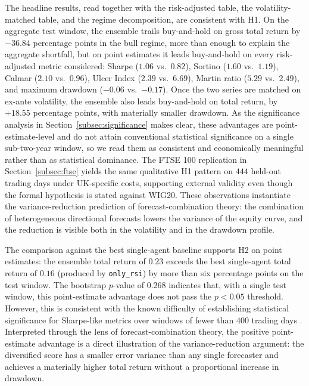 \documentclass{ieeeaccess}
\newcommand{\TRtest}{\ensuremath{0.23}}
\newcommand{\Shtest}{\ensuremath{1.06}}
\newcommand{\MDDtest}{\ensuremath{-0.06}}
\newcommand{\Calmtest}{\ensuremath{2.10}}
\newcommand{\BHsharpe}{\ensuremath{0.82}}
\newcommand{\MDDbh}{\ensuremath{-0.17}}
\newcommand{\Calmbh}{\ensuremath{0.96}}
\newcommand{\BestSingleName}{\texttt{only\_rsi}}
\newcommand{\BestSingleTR}{\ensuremath{0.16}}
\newcommand{\PvsBestSingle}{\ensuremath{0.268}}
\newcommand{\EnsSortino}{\ensuremath{1.60}}
\newcommand{\BHSortino}{\ensuremath{1.19}}
\newcommand{\EnsUlcer}{\ensuremath{2.39}}
\newcommand{\BHUlcer}{\ensuremath{6.69}}
\newcommand{\EnsMartin}{\ensuremath{5.29}}
\newcommand{\BHMartin}{\ensuremath{2.49}}
\newcommand{\VolScaledExcessPP}{\ensuremath{+18.55}}
\newcommand{\BullShortfallPP}{\ensuremath{-36.84}}
\newcommand{\FtseOOSDays}{\ensuremath{444}}
\begin{document}
The headline results, read together with the risk-adjusted table, the volatility-matched table, and the regime decomposition, are consistent with H1. On the aggregate test window, the ensemble trails buy-and-hold on gross total return by $\BullShortfallPP{}$ percentage points in the bull regime, more than enough to explain the aggregate shortfall, but on point estimates it leads buy-and-hold on every risk-adjusted metric considered: Sharpe ($\Shtest{}$ vs.\ $\BHsharpe{}$), Sortino ($\EnsSortino{}$ vs.\ $\BHSortino{}$), Calmar ($\Calmtest{}$ vs.\ $\Calmbh{}$), Ulcer Index ($\EnsUlcer{}$ vs.\ $\BHUlcer{}$), Martin ratio ($\EnsMartin{}$ vs.\ $\BHMartin{}$), and maximum drawdown ($\MDDtest{}$ vs.\ $\MDDbh{}$). Once the two series are matched on ex-ante volatility, the ensemble also leads buy-and-hold on total return, by $\VolScaledExcessPP{}$ percentage points, with materially smaller drawdown. As the significance analysis in Section~\ref{subsec:significance} makes clear, these advantages are point-estimate-level and do not attain conventional statistical significance on a single sub-two-year window, so we read them as consistent and economically meaningful rather than as statistical dominance. The FTSE 100 replication in Section~\ref{subsec:ftse} yields the same qualitative H1 pattern on \FtseOOSDays{} held-out trading days under UK-specific costs, supporting external validity even though the formal hypothesis is stated against WIG20. These observations instantiate the variance-reduction prediction of forecast-combination theory: the combination of heterogeneous directional forecasts lowers the variance of the equity curve, and the reduction is visible both in the volatility and in the drawdown profile.

The comparison against the best single-agent baseline supports H2 on point estimates: the ensemble total return of $\TRtest$ exceeds the best single-agent total return of $\BestSingleTR$ (produced by \BestSingleName{}) by more than six percentage points on the test window. The bootstrap $p$-value of $\PvsBestSingle$ indicates that, with a single test window, this point-estimate advantage does not pass the $p < 0.05$ threshold. However, this is consistent with the known difficulty of establishing statistical significance for Sharpe-like metrics over windows of fewer than $400$ trading days \cite{bailey2014}. Interpreted through the lens of forecast-combination theory, the positive point-estimate advantage is a direct illustration of the variance-reduction argument: the diversified score has a smaller error variance than any single forecaster and achieves a materially higher total return without a proportional increase in drawdown.
\end{document}
